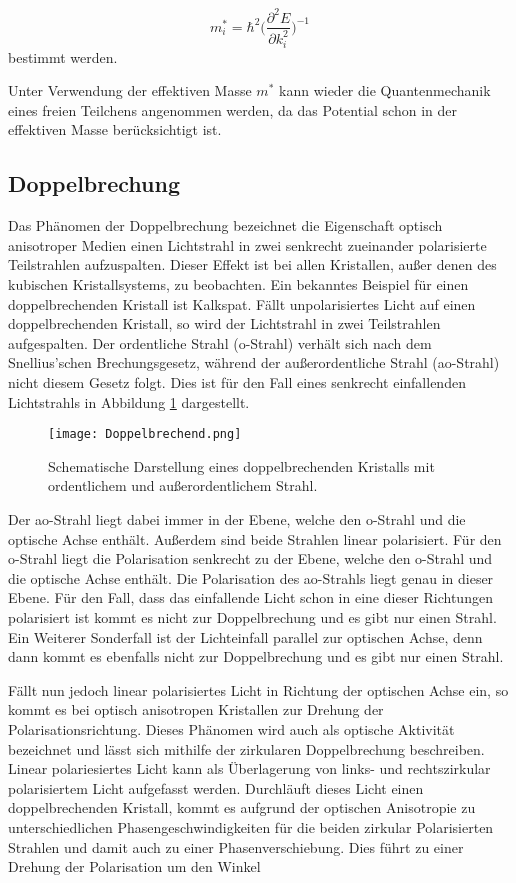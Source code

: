 \begin{equation}
  m^*_i=\hbar^2\Big(\frac{\partial^2 E}{\partial k^2_i} \Big)^{-1}
\end{equation}
bestimmt werden.

Unter Verwendung der effektiven Masse $m^*$ kann wieder die Quantenmechanik eines
freien Teilchens angenommen werden, da das Potential schon in der effektiven Masse
berücksichtigt ist.

\subsection{Doppelbrechung}
Das Phänomen der Doppelbrechung bezeichnet die Eigenschaft optisch anisotroper Medien einen Lichtstrahl in
zwei senkrecht zueinander polarisierte Teilstrahlen aufzuspalten. Dieser Effekt ist bei allen Kristallen, außer
denen des kubischen Kristallsystems, zu beobachten. Ein bekanntes Beispiel für einen doppelbrechenden Kristall ist
Kalkspat.
Fällt unpolarisiertes Licht auf einen doppelbrechenden Kristall, so wird der
Lichtstrahl in zwei Teilstrahlen aufgespalten. Der ordentliche Strahl (o-Strahl)
verhält sich nach dem Snellius'schen Brechungsgesetz, während der außerordentliche Strahl
(ao-Strahl) nicht diesem Gesetz folgt. Dies ist für den Fall eines senkrecht
einfallenden Lichtstrahls in Abbildung \ref{fig:Doppelbrechend} dargestellt.

\begin{figure}[H]
  \centering
  \texttt{[image: Doppelbrechend.png]}
  \caption{Schematische Darstellung eines doppelbrechenden Kristalls mit ordentlichem und außerordentlichem Strahl.}
  \label{fig:Doppelbrechend}
\end{figure}

Der ao-Strahl liegt dabei immer in der Ebene, welche den o-Strahl und die
optische Achse enthält. Außerdem sind beide Strahlen linear polarisiert.
Für den o-Strahl liegt die Polarisation senkrecht zu der Ebene, welche den o-Strahl und die
optische Achse enthält. Die Polarisation des ao-Strahls liegt genau in dieser Ebene.
Für den Fall, dass das einfallende Licht schon in eine dieser Richtungen polarisiert ist
kommt es nicht zur Doppelbrechung und es gibt nur einen Strahl.
Ein Weiterer Sonderfall ist der Lichteinfall parallel zur optischen Achse, denn dann
kommt es ebenfalls nicht zur Doppelbrechung und es gibt nur einen Strahl.


Fällt nun jedoch linear polarisiertes Licht in Richtung der optischen Achse ein, so kommt es
bei optisch anisotropen Kristallen zur Drehung der Polarisationsrichtung. Dieses Phänomen wird
auch als optische Aktivität bezeichnet und lässt sich mithilfe der zirkularen Doppelbrechung
beschreiben.
Linear polariesiertes Licht kann als Überlagerung von links- und rechtszirkular
polarisiertem Licht aufgefasst werden. Durchläuft dieses Licht einen doppelbrechenden Kristall, kommt
es aufgrund der optischen Anisotropie zu unterschiedlichen Phasengeschwindigkeiten für die beiden zirkular
Polarisierten Strahlen und damit auch zu einer Phasenverschiebung. Dies führt
zu einer Drehung der Polarisation um den Winkel

